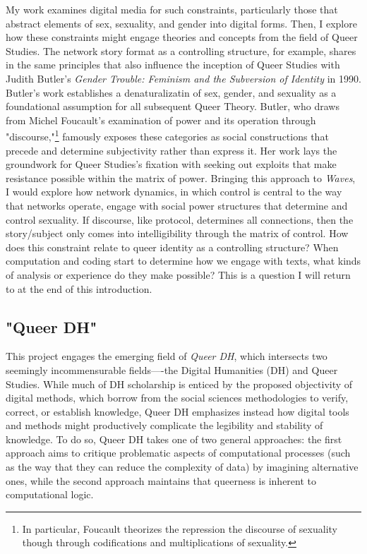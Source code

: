 \documentclass[11pt]{article}
\begin{document}
My work examines digital media for such constraints, particularly
those that abstract elements of sex, sexuality, and gender into
digital forms. Then, I explore how these constraints might engage
theories and concepts from the field of Queer Studies. The network
story format as a controlling structure, for example, shares in the
same principles that also influence the inception of Queer Studies
with Judith Butler's \emph{Gender Trouble: Feminism and the Subversion of
Identity} in 1990. Butler's work establishes a denaturalizatin of sex,
gender, and sexuality as a foundational assumption for all subsequent
Queer Theory. Butler, who draws from Michel Foucault's examination of
power and its operation through "discourse,"\footnote{In particular, Foucault theorizes the repression the discourse
of sexuality though through codifications and multiplications of
sexuality.} famously exposes
these categories as social constructions that precede and determine
subjectivity rather than express it. Her work lays the groundwork for
Queer Studies's fixation with seeking out exploits that make
resistance possible within the matrix of power. Bringing this approach
to \emph{Waves}, I would explore how network dynamics, in which control is
central to the way that networks operate, engage with social power
structures that determine and control sexuality. If discourse, like
protocol, determines all connections, then the story/subject only
comes into intelligibility through the matrix of control. How does
this constraint relate to queer identity as a controlling structure?
When computation and coding start to determine how we engage with
texts, what kinds of analysis or experience do they make possible?
This is a question I will return to at the end of this introduction.

\subsection{"Queer DH"}
\label{sec:orgfa97816}
This project engages the emerging field of \emph{Queer DH}, which
intersects two seemingly incommensurable fields—-the Digital
Humanities (DH) and Queer Studies. While much of DH scholarship is
enticed by the proposed objectivity of digital methods, which borrow
from the social sciences methodologies to verify, correct, or
establish knowledge, Queer DH emphasizes instead how digital tools and
methods might productively complicate the legibility and stability of
knowledge. To do so, Queer DH takes one of two general approaches: the
first approach aims to critique problematic aspects of computational
processes (such as the way that they can reduce the complexity of
data) by imagining alternative ones, while the second approach
maintains that queerness is inherent to computational logic. 
\end{document}
